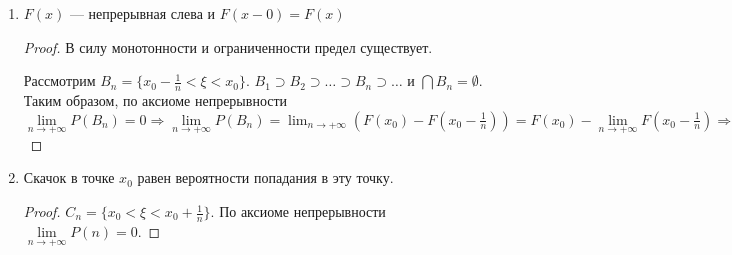 \begin{prop}
\begin{enumerate}
\begin{proof}
                  Рассмотрим \(A_n = \{w : n - 1 \leq \xi(w) < n\}, n\in\N \) --- несовместные события и по счётной аддитивности
                  \begin{align*}
                      1 & = P(\Omega)                                                   \\
                        & =  P\left( \bigcup A_n \right)                                \\
                        & =  \sum_{n = -\infty}^{+\infty} P(a_n)                        \\
                        & =  \sum_{n = -\infty}^{+\infty} F(n) - F(n - 1)               \\
                        & =  \lim_{N \to \infty} \sum_{ - N}^N F(n) - F(n - 1)          \\
                        & =  \lim_{N \to \infty} F(N) - F( - N - 1)                     \\
                        & =  \lim_{N \to \infty} F(N) - \lim_{N \to \infty} F( - N - 1)
                  \end{align*}

                  Таким образом, \(\lim_{N \to \infty} F(N) = 1\), т.к. \(F(N) \leq 1\) и \(F( - N - 1) \geq 0\)
              \end{proof}

        \item \(F(x)\) --- непрерывная слева и \(F(x - 0) = F(x)\)
              \begin{proof}
                  В силу монотонности и ограниченности предел существует.

                  Рассмотрим \(B_n = \{x_0 - \frac{1}{n} < \xi < x_0\} \). \(B_1 \supset B_2 \supset \dots \supset B_n \supset \dots\) и \(\bigcap B_n = \emptyset \). Таким образом, по аксиоме непрерывности \(\lim\limits_{n \to +\infty} P(B_n) = 0 \Rightarrow \lim\limits_{n \to +\infty} P(B_n) = \lim_{n \to +\infty} (F(x_0) - F\left( x_0 - \frac{1}{n} \right)) = F(x_0) - \lim\limits_{n \to +\infty} F\left( x_0 - \frac{1}{n} \right) \Rightarrow F(x_0) = F(x_0 - 0)\)
              \end{proof}

        \item Скачок в точке \(x_0\) равен вероятности попадания в эту точку.
              \begin{proof}
                  \(C_n = \{x_0 < \xi < x_0 + \frac{1}{n}\} \). По аксиоме непрерывности \(\lim\limits_{n \to +\infty} P(n) = 0\).


\end{proof}
\end{enumerate}
\end{prop}
